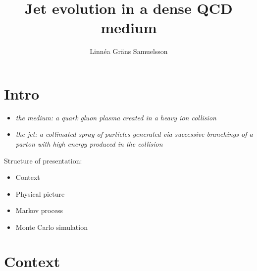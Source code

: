 \documentclass[pstricks,mathserif]{beamer}
\title{Jet evolution in a dense QCD medium}
\author{Linnéa Gräns Samuelsson}
\institute %
{
  Internship at CEA Saclay\\
  Supervisors: Edmond Iancu and Gregory Soyez
}
\begin{document}
\frame{\titlepage}


\section{Intro}

\begin{frame}


\endminipage\hfill
{}
\begin{itemize}
\item \emph{the medium: a quark gluon plasma created in a heavy ion collision}
\item \emph{the jet: a collimated spray of particles generated via successive branchings of a parton with high energy produced in the collision}
\end{itemize}
\endminipage\hfill


\vspace*{1cm}


Structure of presentation:

\begin{itemize}
\item Context
\item Physical picture
\item Markov process
\item Monte Carlo simulation
\end{itemize}

\vspace*{1cm}

\end{frame}

\section{Context}
\end{document}
